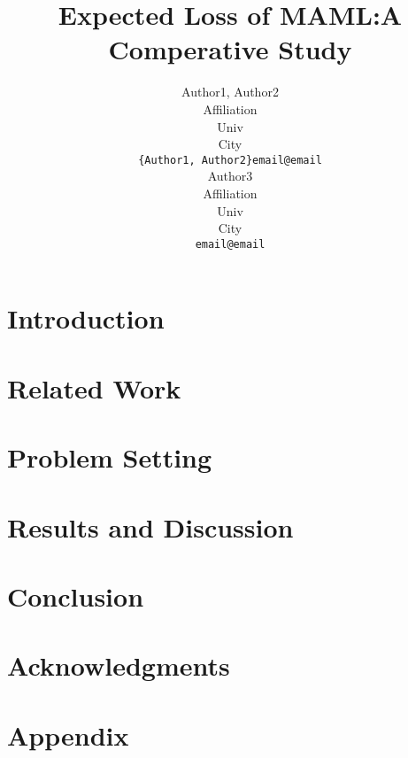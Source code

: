 \documentclass{article}
\title{Expected Loss of MAML:A Comperative Study}
\author{
  Author1, Author2 \\
  Affiliation \\
  Univ \\
  City\\
  \texttt{\{Author1, Author2\}email@email} \\
   \And
  Author3 \\
  Affiliation \\
  Univ \\
  City\\
  \texttt{email@email} \\
}
\newcommand{\version}{v1/}
\begin{document}
\maketitle


\begin{abstract}
  
\end{abstract}



\section{Introduction}\label{sec:intro}
  
\section{Related Work}\label{sec:rw}
  
\section{Problem Setting}\label{sec:methods}
  
\section{Results and Discussion}\label{sec:resdis}
  
\section{Conclusion}\label{sec:conc}
  
\section*{Acknowledgments}
  
  
\newpage
\section{Appendix}
  
\end{document}
